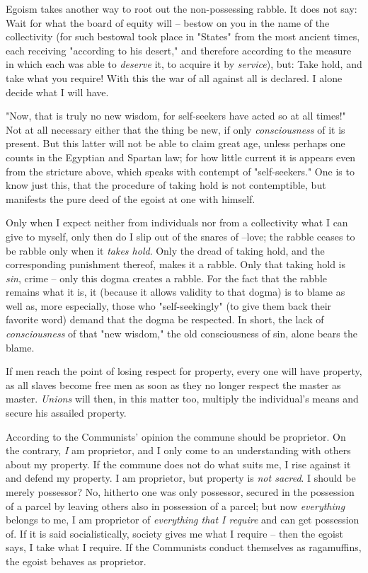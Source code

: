 Egoism takes another way to root out the non-possessing rabble. It does not 
say: Wait for what the board of equity will -- bestow on you in the name of 
the collectivity (for such bestowal took place in "{}States"{} from the most 
ancient times, each receiving "{}according to his desert,"{} and therefore 
according to the measure in which each was able to \textit{deserve} it, to 
acquire it by \textit{service}), but: Take hold, and take what you require! 
With this the war of all against all is declared. I alone decide what I will 
have.

"{}Now, that is truly no new wisdom, for self-seekers have acted so at all 
times!"{} Not at all necessary either that the thing be new, if only 
\textit{consciousness} of it is present. But this latter will not be able to 
claim great age, unless perhaps one counts in the Egyptian and Spartan law; 
for how little current it is appears even from the stricture above, which 
speaks with contempt of "{}self-seekers."{} One is to know just this, that the 
procedure of taking hold is not contemptible, but manifests the pure deed of 
the egoist at one with himself.

Only when I expect neither from individuals nor from a collectivity what I can 
give to myself, only then do I slip out of the snares of --love; the rabble 
ceases to be rabble only when it \textit{takes hold}. Only the dread of taking 
hold, and the corresponding punishment thereof, makes it a rabble. Only that 
taking hold is \textit{sin}, crime -- only this dogma creates a rabble. For 
the fact that the rabble remains what it is, it (because it allows validity to 
that dogma) is to blame as well as, more especially, those who 
"{}self-seekingly"{} (to give them back their favorite word) demand that the 
dogma be respected. In short, the lack of \textit{consciousness} of that 
"{}new wisdom,"{} the old consciousness of sin, alone bears the blame.

If men reach the point of losing respect for property, every one will have 
property, as all slaves become free men as soon as they no longer respect the 
master as master. \textit{Unions} will then, in this matter too, multiply the 
individual's means and secure his assailed property.

According to the Communists' opinion the commune should be proprietor. On the 
contrary, \textit{I} am proprietor, and I only come to an understanding with 
others about my property. If the commune does not do what suits me, I rise 
against it and defend my property. I am proprietor, but property is 
\textit{not sacred}. I should be merely possessor? No, hitherto one was only 
possessor, secured in the possession of a parcel by leaving others also in 
possession of a parcel; but now \textit{everything} belongs to me, I am 
proprietor of \textit{everything that I require} and can get possession of. If 
it is said socialistically, society gives me what I require -- then the egoist 
says, I take what I require. If the Communists conduct themselves as 
ragamuffins, the egoist behaves as proprietor.

